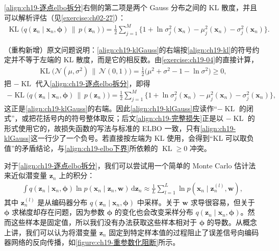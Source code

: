 \documentclass[../../main.tex]{subfiles}
\begin{document}
\eqref{align:ch19-逐点elbo拆分}右侧的第二项是两个 Gauss 分布之间的 KL 散度，并且可以解析评估（见\cref{exercise:ch02-27}）：
\begin{align}
\operatorname{KL}\big(q(\bm{z}_n\mid\bm{x}_n,\bm{\phi})\,\|\,p(\bm{z}_n)\big)=\frac{1}{2}\sum_{j=1}^{M}\Big\{1+\ln\sigma_j^{2}(\bm{x}_n)-\mu_j^{2}(\bm{x}_n)-\sigma_j^{2}(\bm{x}_n)\Big\}.
\label{align:ch19-klGauss}
\end{align}

\begin{remark}（重构新增）原文问题说明：\eqref{align:ch19-klGauss}的右端按\eqref{align:ch19-kl}的符号约定并不等于左端的 KL 散度，而是它的相反数。由\cref{exercise:ch19-04}的直接计算，
\begin{align*}
\operatorname{KL}\big(\mathcal{N}(\mu,\sigma^{2})\,\|\,\mathcal{N}(0,1)\big)=\frac{1}{2}\Big(\mu^{2}+\sigma^{2}-1-\ln\sigma^{2}\Big)\geqslant0,
\end{align*}
把 $-\operatorname{KL}$ 代入\eqref{align:ch19-逐点elbo拆分}，即得
\begin{align*}
-\operatorname{KL}\big(q(\bm{z}_n\mid\bm{x}_n,\bm{\phi})\,\|\,p(\bm{z}_n)\big)=\frac{1}{2}\sum_{j=1}^{M}\Big\{1+\ln\sigma_j^{2}(\bm{x}_n)-\mu_j^{2}(\bm{x}_n)-\sigma_j^{2}(\bm{x}_n)\Big\},
\end{align*}
这正是\eqref{align:ch19-klGauss}的右端。因此\eqref{align:ch19-klGauss}应读作“$-\operatorname{KL}$ 的闭式”，或把花括号内的符号整体取反；后文\eqref{align:ch19-完整损失}正是以 $-\operatorname{KL}$ 的形式使用它的，故损失函数的写法与标准的 ELBO 一致，只有\eqref{align:ch19-klGauss}这一行少了一个负号。若直接按左端为 KL 使用，会得到“KL 可以取负值”的矛盾结论，与\eqref{align:ch19-elbo下界}所依赖的 $\operatorname{KL}\geqslant0$ 冲突。
\end{remark}

对于\eqref{align:ch19-逐点elbo拆分}，我们可以尝试用一个简单的 Monte Carlo 估计法来近似潜变量 $\bm{z}_n$ 上的积分：
\begin{align}
\int q(\bm{z}_n\mid\bm{x}_n,\bm{\phi})\ln p(\bm{x}_n\mid\bm{z}_n,\bm{w})\,\mathrm{d}\bm{z}_n\approx\frac{1}{L}\sum_{l=1}^{L}\ln p(\bm{x}_n\mid\bm{z}_n^{(l)},\bm{w}),
\label{align:ch19-蒙特卡洛}
\end{align}
其中 $\bm{z}_n^{(l)}$ 是从编码器分布 $q(\bm{z}_n\mid\bm{x}_n,\bm{\phi})$ 中采样。关于 $\bm{w}$ 求导很容易，但关于 $\bm{\phi}$ 求梯度却存在问题，因为参数 $\bm{\phi}$ 的变化也会改变采样分布 $q(\bm{z}_n\mid\bm{x}_n,\bm{\phi})$。然而这些样本是固定值，所以我们没有办法获取这些样本相对于 $\bm{\phi}$ 的导数。从概念上讲，我们可以认为将潜变量 $\bm{z}_n$ 固定到特定样本值的过程阻止了误差信号向编码器网络的反向传播，如\cref{figure:ch19-重参数化阻断}所示。
\end{document}
